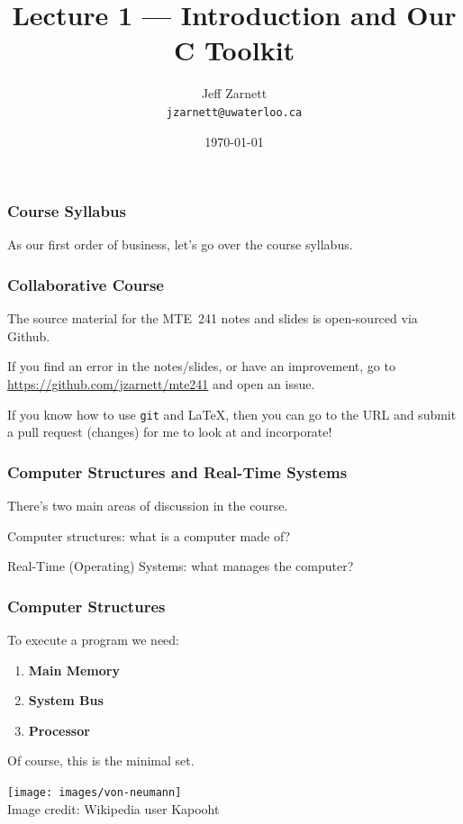 

\title{Lecture 1 --- Introduction and Our C Toolkit }

\author{Jeff Zarnett \\ \small \texttt{jzarnett@uwaterloo.ca}}
\date{\today}




\begin{frame}
	\titlepage

\end{frame}

\begin{frame}
	\frametitle{Course Syllabus}

	As our first order of business, let's go over the course syllabus.

\end{frame}

\begin{frame}
	\frametitle{Collaborative Course}

	The source material for the MTE~241 notes and slides is open-sourced via Github.

	If you find an error in the notes/slides, or have an improvement, go to \url{https://github.com/jzarnett/mte241} and open an issue.

	If you know how to use \texttt{git} and \LaTeX, then you can go to the URL and submit a pull request (changes) for me to look at and incorporate!


\end{frame}

\begin{frame}
\frametitle{Computer Structures and Real-Time Systems}

There's two main areas of discussion in the course.

Computer structures: what is a computer made of?

Real-Time (Operating) Systems: what manages the computer? 

\end{frame}

\begin{frame}
\frametitle{Computer Structures}

To execute a program we need:

	\begin{enumerate}
		\item \textbf{Main Memory}
		\item \textbf{System Bus}
		\item \textbf{Processor}
	\end{enumerate}

	Of course, this is the minimal set.

	\begin{center}
		\texttt{[image: images/von-neumann]}\\
		Image credit: Wikipedia user Kapooht
	\end{center}



\end{frame}

